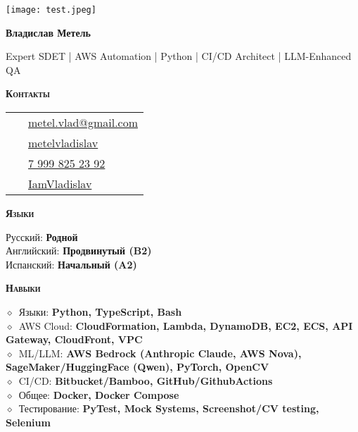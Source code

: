 \documentclass[10pt, a4paper]{article}
\newcommand{\normal}[1]{{\normalsize$\diamond$\ #1}}
\newcommand{\headleft}[1]{\vspace*{2ex}\textsc{\textbf{#1}}\par%
	\vspace*{-1.5ex}\hrulefill\par\vspace*{0.7ex}}
\begin{document}
	
	\setlength{\topskip}{0pt}
	\setlength{\parindent}{0pt}
	\setlength{\parskip}{0pt}
	\setlength{\fboxsep}{0pt}
	\pagestyle{empty}
	\raggedbottom
	
	\begin{minipage}[t]{0.33\textwidth} %
		\colorbox{cvblue!90}{\color{white}  %
			\textwidth\relax%
			\begin{minipage}[t][297mm][t]{0.82\textwidth}
				\raggedright
				\vspace*{2ex} %
				\null\hfill\texttt{[image: test.jpeg]}\hfill\null

				
				\vspace*{1.5ex}
				
				\Large  \textbf{Владислав Метель} \normalsize 
				
				\vspace*{1.5ex}
				
				Expert SDET | AWS Automation | Python | CI/CD Architect | LLM-Enhanced QA
				
				\headleft{Контакты}
				
				\begin{tabular}{ @{}c l }
					\Letter\ & \href{mailto:metel.vlad@gmail.com?subject=Job Opportunity}{metel.vlad@gmail.com} \\
					\faLinkedin\ & \href{https://www.linkedin.com/in/metelvladislav}{metelvladislav} \\
					\faMobile*\ & \href{tel:+7 999 825 23 92}{\raisebox{0.2ex}{+}7 999 825 23 92} \\
					\faGithub\ & \href{https://github.com/IamVladislav}{IamVladislav} \\
				\end{tabular}
				
				\headleft{Языки}
				Русский: \textbf{Родной} \\[2pt]
				Английский: \textbf{Продвинутый (B2)} \\[2pt]
				Испанский: \textbf{Начальный (A2)}
				
				
				\headleft{Навыки}
				\normal{Языки: \textbf{Python, TypeScript, Bash}} \\[1pt]
				\normal{AWS Cloud: \textbf{CloudFormation, Lambda, DynamoDB, EC2, ECS, API Gateway, CloudFront, VPC}} \\[1pt]
				\normal{ML/LLM: \textbf{AWS Bedrock (Anthropic Claude, AWS Nova), SageMaker/HuggingFace (Qwen), PyTorch, OpenCV}} \\[1pt]
				\normal{CI/CD: \textbf{Bitbucket/Bamboo, GitHub/GithubActions}} \\[1pt]
				\normal{Общее: \textbf{Docker, Docker Compose}} \\[1pt]
				\normal{Тестирование: \textbf{PyTest, Mock Systems, Screenshot/CV testing, Selenium}}
				

\end{minipage}}
\end{minipage}
\end{document}
